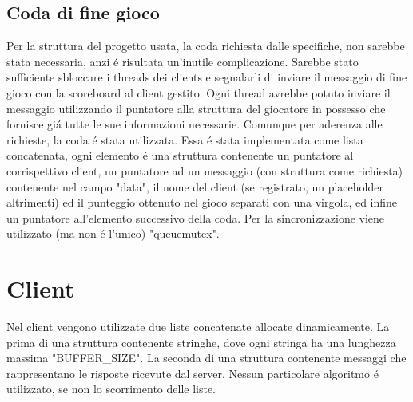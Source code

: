 \subsection{Coda di fine gioco}

Per la struttura del progetto usata, la coda richiesta dalle specifiche, non sarebbe stata necessaria, anzi \'e risultata un'inutile complicazione. Sarebbe stato sufficiente sbloccare i threads dei clients e segnalarli di inviare il messaggio di fine gioco con la scoreboard al client gestito. Ogni thread avrebbe potuto inviare il messaggio utilizzando il puntatore alla struttura del giocatore in possesso che fornisce gi\'a tutte le sue informazioni necessarie. Comunque per aderenza alle richieste, la coda \'e stata utilizzata. Essa \'e stata implementata come lista concatenata, ogni elemento \'e una struttura contenente un puntatore al corrispettivo client, un puntatore ad un messaggio (con struttura come richiesta) contenente nel campo "data", il nome del client (se registrato, un placeholder altrimenti) ed il punteggio ottenuto nel gioco separati con una virgola, ed infine un puntatore all'elemento successivo della coda. Per la sincronizzazione viene utilizzato (ma non \'e l'unico) "queuemutex".
	
\section{Client}

Nel client vengono utilizzate due liste concatenate allocate dinamicamente. La prima di una struttura contenente stringhe, dove ogni stringa ha una lunghezza massima "BUFFER\_SIZE". La seconda di una struttura contenente messaggi che rappresentano le risposte ricevute dal server. Nessun particolare algoritmo \'e utilizzato, se non lo scorrimento delle liste.



